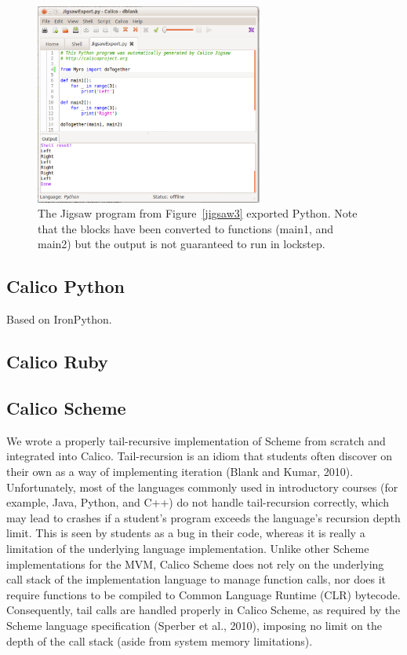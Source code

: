\documentclass[preprint]{sigplanconf}
\begin{document}
\begin{figure}[h!]
  \centering
    \includegraphics[width=75mm]{jigsaw4.eps} 
  \caption{The Jigsaw program from Figure~\ref{jigsaw3} exported Python. Note
that the blocks have been converted to functions (main1, and main2)
but the output is not guaranteed to run in lockstep.}
  \label{jigsaw4}
\end{figure}

\subsection{Calico Python}

Based on IronPython. 

\subsection{Calico Ruby}

\subsection{Calico Scheme}

We wrote a properly tail-recursive implementation of Scheme from
scratch and integrated into Calico.  Tail-recursion is an idiom that
students often discover on their own as a way of implementing
iteration (Blank and Kumar, 2010). Unfortunately, most of the
languages commonly used in introductory courses (for example, Java,
Python, and C++) do not handle tail-recursion correctly, which may
lead to crashes if a student’s program exceeds the language’s
recursion depth limit. This is seen by students as a bug in their
code, whereas it is really a limitation of the underlying language
implementation. Unlike other Scheme implementations for the MVM,
Calico Scheme does not rely on the underlying call stack of the
implementation language to manage function calls, nor does it require
functions to be compiled to Common Language Runtime (CLR)
bytecode. Consequently, tail calls are handled properly in Calico
Scheme, as required by the Scheme language specification (Sperber et
al., 2010), imposing no limit on the depth of the call stack (aside
from system memory limitations).
\end{document}
